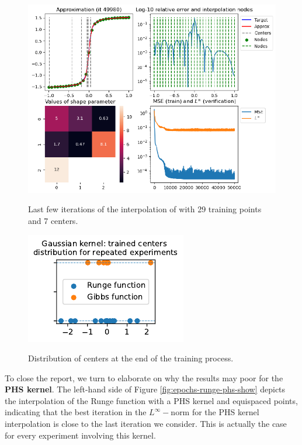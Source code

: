 \documentclass[12pt]{report} %
\newcommand{\tmverbatim}[1]{\text{{\ttfamily{#1}}}}
\begin{document}
\begin{figure}[ht]
  {\includegraphics[width=.9\textwidth]{imagenes/experiments/1d/re_testing/reproducibility_gibbs.pdf}}
  \caption{Last few iterations of the interpolation of
  \tmverbatim{gibbs\_function} with 29 training points and 7
  centers.\label{last-few-iterations-gibbs}}
\end{figure}

\begin{figure}
\caption{Distribution of centers at the end of the training
  process.\label{fig-centers-end}}
{\includegraphics[width=\textwidth]{imagenes/experiments/1d/re_testing/reproducibility_centers.pdf}}
\end{figure} 

\newpage

To close the report, we turn to elaborate on why the results may poor for the \textbf{PHS kernel}.
The left-hand side of Figure \ref{fig:epochs-runge-phs-show} depicts the interpolation of the Runge function with a PHS kernel and equispaced points, indicating that the best iteration in the $L^\infty-$norm for the PHS kernel interpolation is close to the last iteration we consider. This is actually the case for every experiment involving this kernel.
\end{document}
